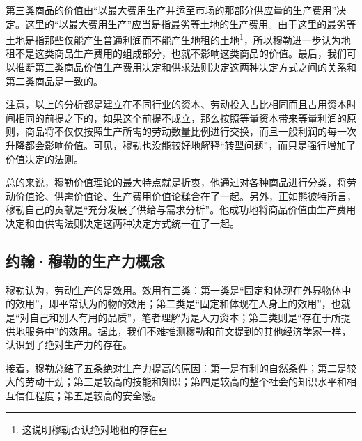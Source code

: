 第三类商品的价值由“以最大费用生产并运至市场的那部分供应量的生产费用”\cite[535]{YueHan*MuLeZhengZhiJingJiXueYuanLiJiQiZaiSheHuiZheXueShangDeRuoGanYingYongShangJuan1991}决定。这里的“以最大费用生产”应当是指最劣等土地的生产费用。由于这里的最劣等土地是指那些仅能产生普通利润而不能产生地租的土地\footnote{这说明穆勒否认绝对地租的存在\cite[176]{YanZhiJieXiFangJingJiXueShuoShiJiaoChengDiErBan2013}}，所以穆勒进一步认为地租不是这类商品生产费用的组成部分，也就不影响这类商品的价值\cite[596]{YueHan*MuLeZhengZhiJingJiXueYuanLiJiQiZaiSheHuiZheXueShangDeRuoGanYingYongShangJuan1991}。最后，我们可以推断第三类商品价值生产费用决定和供求法则决定这两种决定方式之间的关系和第二类商品是一致的。

注意，以上的分析都是建立在不同行业的资本、劳动投入占比相同而且占用资本时间相同的前提之下的，如果这个前提不成立，那么按照等量资本带来等量利润的原则，商品将不仅仅按照生产所需的劳动数量比例进行交换，而且一般利润的每一次升降都会影响价值\cite[526-527]{YueHan*MuLeZhengZhiJingJiXueYuanLiJiQiZaiSheHuiZheXueShangDeRuoGanYingYongShangJuan1991}。可见，穆勒也没能较好地解释“转型问题”，而只是强行增加了价值决定的法则。

总的来说，穆勒价值理论的最大特点就是折衷，他通过对各种商品进行分类，将劳动价值论、供需价值论、生产费用价值论糅合在了一起。另外，正如熊彼特所言，穆勒自己的贡献是“充分发展了供给与需求分析”\cite[359]{YueSeFu*XiongBiTeJingJiFenXiShiDi2Juan2017}。他成功地将商品价值由生产费用决定和由供需法则决定这两种决定方式统一在了一起。

 \subsection{约翰·穆勒的生产力概念}

穆勒认为，劳动生产的是效用\cite[60]{YueHan*MuLeZhengZhiJingJiXueYuanLiJiQiZaiSheHuiZheXueShangDeRuoGanYingYongShangJuan1991}。效用有三类：第一类是“固定和体现在外界物体中的效用”\cite[62]{YueHan*MuLeZhengZhiJingJiXueYuanLiJiQiZaiSheHuiZheXueShangDeRuoGanYingYongShangJuan1991}，即平常认为的物的效用；第二类是“固定和体现在人身上的效用”，也就是“对自己和别人有用的品质”\cite[62]{YueHan*MuLeZhengZhiJingJiXueYuanLiJiQiZaiSheHuiZheXueShangDeRuoGanYingYongShangJuan1991}，笔者理解为是人力资本；第三类则是“存在于所提供地服务中”的效用\cite[62]{YueHan*MuLeZhengZhiJingJiXueYuanLiJiQiZaiSheHuiZheXueShangDeRuoGanYingYongShangJuan1991}。据此，我们不难推测穆勒和前文提到的其他经济学家一样，认识到了绝对生产力的存在。

接着，穆勒总结了五条绝对生产力提高的原因：第一是有利的自然条件；第二是较大的劳动干劲；第三是较高的技能和知识；第四是较高的整个社会的知识水平和相互信任程度；第五是较高的安全感。\cite[123-135]{YueHan*MuLeZhengZhiJingJiXueYuanLiJiQiZaiSheHuiZheXueShangDeRuoGanYingYongShangJuan1991}

